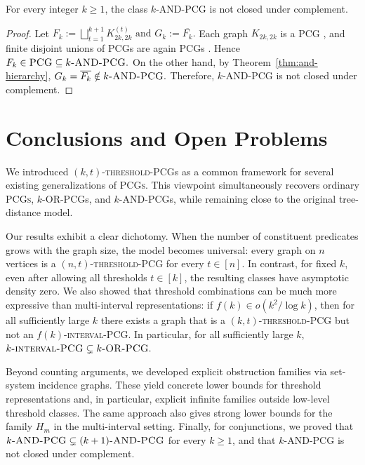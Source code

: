 \documentclass[a4paper,UKenglish,cleveref,autoref,thm-restate]{socg-lipics-v2021}
\begin{document}
\begin{theorem}\label{thm:and-not-complement}
For every integer $k\ge 1$, the class \(k\)-\textsc{AND}-\textsc{PCG} is not closed
under complement.
\end{theorem}

\begin{proof}
Let
\(
F_k:=\bigsqcup_{t=1}^{k+1} K^{(t)}_{2k,2k}
\text{ and }
G_k:=\overline{F_k}.
\)
Each graph \(K_{2k,2k}\) is a \textsc{PCG} \cite{Yanhaona2010DiscoveringPCV}, and finite disjoint unions of
\textsc{PCG}s are again \textsc{PCG}s \cite{XIAO2020105875}. Hence
\(
F_k\in \textsc{PCG}\subseteq k\textsc{-AND-\textsc{PCG}}.
\)
On the other hand, by Theorem~\ref{thm:and-hierarchy},
\(
G_k=\overline{F_k}\notin k\textsc{-AND-\textsc{PCG}}.
\)
Therefore, \(k\)-\textsc{AND}-\textsc{PCG} is not closed under complement.
\end{proof}


\section{Conclusions and Open Problems}\label{sec:conclusion}

We introduced \textsc{$(k,t)$-threshold-\textsc{PCG}}s as a common framework for several
existing generalizations of \textsc{PCGs}. This viewpoint simultaneously recovers
ordinary \textsc{PCGs}, \textsc{$k$-\textsc{OR}-\textsc{PCG}}s, and
\textsc{$k$-\textsc{AND}-\textsc{PCG}}s, while remaining close to the original
tree-distance model.

Our results exhibit a clear dichotomy. When the number of constituent predicates grows
with the graph size, the model becomes universal: every graph on \(n\) vertices is a
\textsc{$(n,t)$-threshold-\textsc{PCG}} for every \(t\in[n]\). In contrast, for
fixed \(k\), even after allowing all thresholds \(t\in[k]\), the resulting classes
have asymptotic density zero. We also showed that threshold combinations can be much
more expressive than multi-interval representations: if \(f(k)\in o(k^2/\log k)\), then
for all sufficiently large \(k\) there exists a graph that is a
\textsc{$(k,t)$-threshold-\textsc{PCG}} but not an
\textsc{$f(k)$-interval-\textsc{PCG}}. In particular, for all sufficiently large \(k\),
\(
k\textsc{-interval-\textsc{PCG}} \subsetneq k\textsc{-OR-\textsc{PCG}}.
\)

Beyond counting arguments, we developed explicit obstruction families via set-system
incidence graphs. These yield concrete lower bounds for threshold representations and, in
particular, explicit infinite families outside low-level threshold classes. The same
approach also gives strong lower bounds for the family \(H_m\) in the multi-interval
setting. Finally, for conjunctions, we proved that
\(
k\textsc{-AND-\textsc{PCG}} \subsetneq (k+1)\textsc{-AND-\textsc{PCG}}
\)
for every \(k\ge 1\), and that \(k\)-\textsc{AND}-\textsc{PCG} is not closed under
complement.
\end{document}
